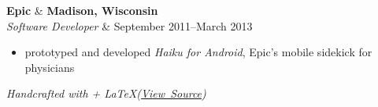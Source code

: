 \documentclass[line,margin]{res}
\begin{document}
\begin{resume}
    \begin{tabularx}
      \textbf{Epic}               & \hfill \textbf{Madison, Wisconsin}  \\
      \textit{Software Developer} & \hfill September 2011--March 2013 \\
    \end{tabularx}
    \vspace{-0.15in}
    \begin{itemize}
        \item prototyped and developed \textit{Haiku for Android}, Epic's mobile sidekick for physicians
    \end{itemize}

\end{resume}

\vfill
\hfill \textit{Handcrafted with \heartsuit + \LaTeX (\href{https://github.com/Cheezmeister/resume/raw/master/b_luchen_resume.tex}{View\ Source})}
\end{document}
